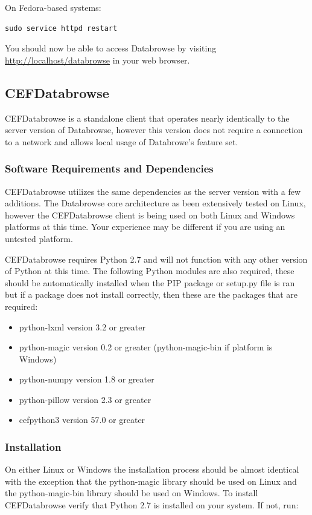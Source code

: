 \documentclass[10pt]{article}
\begin{document}
On Fedora-based systems:

\begin{verbatim}
sudo service httpd restart
\end{verbatim}

You should now be able to access Databrowse by visiting \url{http://localhost/databrowse} in your web browser.

\subsection{CEFDatabrowse}
CEFDatabrowse is a standalone client that operates nearly identically to the server version of Databrowse, however this version does not require a connection to a network and allows local usage of Databrowe's feature set.

\subsubsection{Software Requirements and Dependencies}
CEFDatabrowse utilizes the same dependencies as the server version with a few additions. The Databrowse core architecture as been extensively tested on Linux, however the CEFDatabrowse client is being used on both Linux and Windows platforms at this time. Your experience may be different if you are using an untested platform.

CEFDatabrowse requires Python 2.7 and will not function with any other version of Python at this time. The following Python modules are also required, these should be automatically installed when the PIP package or setup.py file is ran but if a package does not install correctly, then these are the packages that are required:

\begin{itemize}
\item python-lxml version 3.2 or greater
\item python-magic version 0.2 or greater (python-magic-bin if platform is Windows)
\item python-numpy version 1.8 or greater
\item python-pillow version 2.3 or greater
\item cefpython3 version 57.0 or greater
\end{itemize}
\subsubsection{Installation}
On either Linux or Windows the installation process should be almost identical with the exception that the python-magic library should be used on Linux and the python-magic-bin library should be used on Windows. To install CEFDatabrowse verify that Python 2.7 is installed on your system. If not, run:
\end{document}
